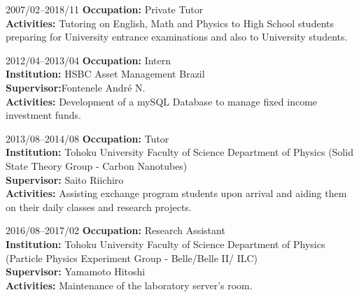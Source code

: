 \documentclass[a4paper]{article}
\begin{document}
\begin{CV}
 
\item[2007/02--2018/11] \textbf{Occupation:} Private Tutor
\\ \textbf{Activities:} Tutoring on English, Math and Physics to High School
students preparing for University entrance examinations and also to University students.


 
\item[2012/04--2013/04] \textbf{Occupation:} Intern
\\ \textbf{Institution:} HSBC Asset Management Brazil
\\ \textbf{Supervisor:}Fontenele André N.
\\ \textbf{Activities:} Development of a mySQL Database to manage fixed income
investment funds.

\item[2013/08--2014/08] \textbf{Occupation:} Tutor
\\ \textbf{Institution:} Tohoku University Faculty of Science Department of
Physics (Solid State Theory Group - Carbon Nanotubes)
\\ \textbf{Supervisor:} Saito Riichiro
\\ \textbf{Activities:} Assisting exchange program students upon arrival and
aiding them on their daily classes and research projects.

\item[2016/08--2017/02] \textbf{Occupation:} Research Assistant
\\ \textbf{Institution:} Tohoku University Faculty of Science Department of
Physics (Particle Physics Experiment Group - Belle/Belle II/ ILC)
\\ \textbf{Supervisor:} Yamamoto Hitoshi
\\ \textbf{Activities:} Maintenance of the laboratory server's room.


\end{CV}
\end{document}
